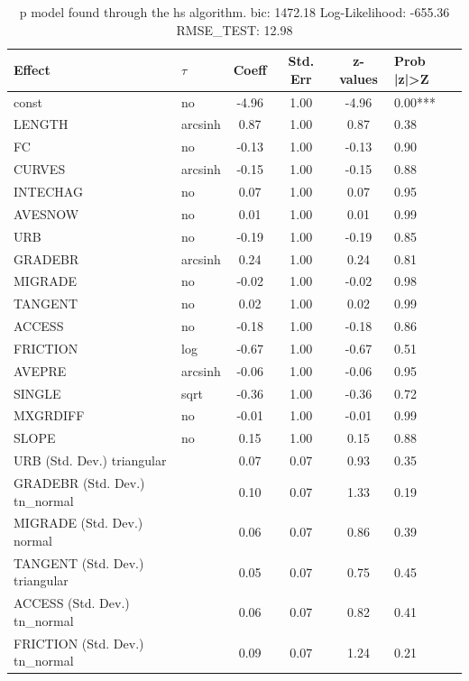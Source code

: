 \begin{table}
	\caption{p model found through the hs algorithm. bic: 1472.18 Log-Likelihood: -655.36 RMSE_TEST: 12.98}
	\begin{center}
		\begin{tabular}{|l|l|c|c|c|l|}
			\hline
			Effect & $\tau$ & Coeff & Std. Err & z-values & Prob |z|>Z \\
			\hline
			const & no & -4.96 & 1.00 & -4.96 & 0.00*** \\
			\hline
			LENGTH & arcsinh & 0.87 & 1.00 & 0.87 & 0.38 \\
			\hline
			FC & no & -0.13 & 1.00 & -0.13 & 0.90 \\
			\hline
			CURVES & arcsinh & -0.15 & 1.00 & -0.15 & 0.88 \\
			\hline
			INTECHAG & no & 0.07 & 1.00 & 0.07 & 0.95 \\
			\hline
			AVESNOW & no & 0.01 & 1.00 & 0.01 & 0.99 \\
			\hline
			URB & no & -0.19 & 1.00 & -0.19 & 0.85 \\
			\hline
			GRADEBR & arcsinh & 0.24 & 1.00 & 0.24 & 0.81 \\
			\hline
			MIGRADE & no & -0.02 & 1.00 & -0.02 & 0.98 \\
			\hline
			TANGENT & no & 0.02 & 1.00 & 0.02 & 0.99 \\
			\hline
			ACCESS & no & -0.18 & 1.00 & -0.18 & 0.86 \\
			\hline
			FRICTION & log & -0.67 & 1.00 & -0.67 & 0.51 \\
			\hline
			AVEPRE & arcsinh & -0.06 & 1.00 & -0.06 & 0.95 \\
			\hline
			SINGLE & sqrt & -0.36 & 1.00 & -0.36 & 0.72 \\
			\hline
			MXGRDIFF & no & -0.01 & 1.00 & -0.01 & 0.99 \\
			\hline
			SLOPE & no & 0.15 & 1.00 & 0.15 & 0.88 \\
			\hline
			URB (Std. Dev.) triangular &  & 0.07 & 0.07 & 0.93 & 0.35 \\
			\hline
			GRADEBR (Std. Dev.) tn_normal &  & 0.10 & 0.07 & 1.33 & 0.19 \\
			\hline
			MIGRADE (Std. Dev.) normal &  & 0.06 & 0.07 & 0.86 & 0.39 \\
			\hline
			TANGENT (Std. Dev.) triangular &  & 0.05 & 0.07 & 0.75 & 0.45 \\
			\hline
			ACCESS (Std. Dev.) tn_normal &  & 0.06 & 0.07 & 0.82 & 0.41 \\
			\hline
			FRICTION (Std. Dev.) tn_normal &  & 0.09 & 0.07 & 1.24 & 0.21 \\

\end{tabular}
\end{center}
\end{table}
